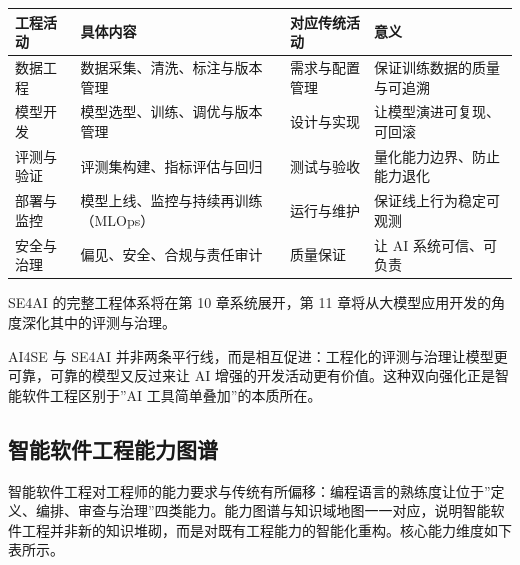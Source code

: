 \documentclass[12pt,a4paper,twoside,openany]{ctexbook}
\numberwithin{figure}{chapter}
\numberwithin{table}{chapter}
\newcounter{none}
\begin{document}
{\def\LTcaptype{none} %
\begin{longtable}[]{@{}
  >{\raggedright\arraybackslash}p{}
  >{\raggedright\arraybackslash}p{}
  >{\raggedright\arraybackslash}p{}
  >{\raggedright\arraybackslash}p{}@{}}
\toprule\noalign{}
\begin{minipage}[b]{\linewidth}\raggedright
工程活动
\end{minipage} & \begin{minipage}[b]{\linewidth}\raggedright
具体内容
\end{minipage} & \begin{minipage}[b]{\linewidth}\raggedright
对应传统活动
\end{minipage} & \begin{minipage}[b]{\linewidth}\raggedright
意义
\end{minipage} \\
\midrule\noalign{}
\endhead
\bottomrule\noalign{}
\endlastfoot
数据工程 & 数据采集、清洗、标注与版本管理 & 需求与配置管理 &
保证训练数据的质量与可追溯 \\
模型开发 & 模型选型、训练、调优与版本管理 & 设计与实现 &
让模型演进可复现、可回滚 \\
评测与验证 & 评测集构建、指标评估与回归 & 测试与验收 &
量化能力边界、防止能力退化 \\
部署与监控 & 模型上线、监控与持续再训练（MLOps） & 运行与维护 &
保证线上行为稳定可观测 \\
安全与治理 & 偏见、安全、合规与责任审计 & 质量保证 & 让 AI
系统可信、可负责 \\
\end{longtable}
}

SE4AI 的完整工程体系将在第 10 章系统展开，第 11
章将从大模型应用开发的角度深化其中的评测与治理。

AI4SE 与 SE4AI
并非两条平行线，而是相互促进：工程化的评测与治理让模型更可靠，可靠的模型又反过来让
AI 增强的开发活动更有价值。这种双向强化正是智能软件工程区别于''AI
工具简单叠加''的本质所在。

\subsection{智能软件工程能力图谱}\label{ux667aux80fdux8f6fux4ef6ux5de5ux7a0bux80fdux529bux56feux8c31}

智能软件工程对工程师的能力要求与传统有所偏移：编程语言的熟练度让位于''定义、编排、审查与治理''四类能力。能力图谱与知识域地图一一对应，说明智能软件工程并非新的知识堆砌，而是对既有工程能力的智能化重构。核心能力维度如下表所示。
\end{document}
